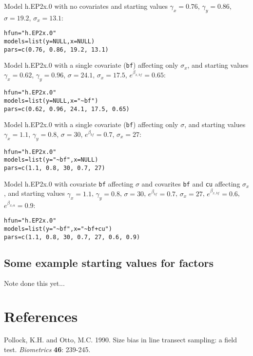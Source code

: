\documentclass{article}
\begin{document}
\noindent
Model h.EP2x.0 with no covariates and starting values $\gamma_x=0.76$, $\gamma_y=0.86$, $\sigma=19.2$, $\sigma_x=13.1$:
\begin{verbatim}
hfun="h.EP2x.0"
models=list(y=NULL,x=NULL)
pars=c(0.76, 0.86, 19.2, 13.1)
\end{verbatim}

\noindent
Model h.EP2x.0 with a single covariate (\verb|bf|) affecting only $\sigma_x$, and starting values $\gamma_x=0.62$, $\gamma_y=0.96$, $\sigma=24.1$, $\sigma_x=17.5$, $e^{\beta_{x,bf}}=0.65$:
\begin{verbatim}
hfun="h.EP2x.0"
models=list(y=NULL,x="~bf")
pars=c(0.62, 0.96, 24.1, 17.5, 0.65)
\end{verbatim}

\noindent
Model h.EP2x.0 with a single covariate (\verb|bf|) affecting only $\sigma$, and starting values $\gamma_x=1.1$, $\gamma_y=0.8$, $\sigma=30$, $e^{\beta_{bf}}=0.7$, $\sigma_x=27$:
\begin{verbatim}
hfun="h.EP2x.0"
models=list(y="~bf",x=NULL)
pars=c(1.1, 0.8, 30, 0.7, 27)
\end{verbatim}

\noindent
Model h.EP2x.0 with covariate \verb|bf| affecting $\sigma$ and covarites \verb|bf| and \verb|cu| affecting $\sigma_x$, and starting values $\gamma_x=1.1$, $\gamma_y=0.8$, $\sigma=30$, $e^{\beta_{bf}}=0.7$, $\sigma_x=27$, $e^{\beta_{x,bf}}=0.6$, $e^{\beta_{x_cu}}=0.9$:
\begin{verbatim}
hfun="h.EP2x.0"
models=list(y="~bf",x="~bf+cu")
pars=c(1.1, 0.8, 30, 0.7, 27, 0.6, 0.9)
\end{verbatim}

\subsection{Some example starting values for factors}

Note done this yet...

\section*{References}

Pollock, K.H. and Otto, M.C. 1990. Size bias in line transect sampling: a field test. {\it Biometrics} {\bf 46}: 239-245.
\end{document}
